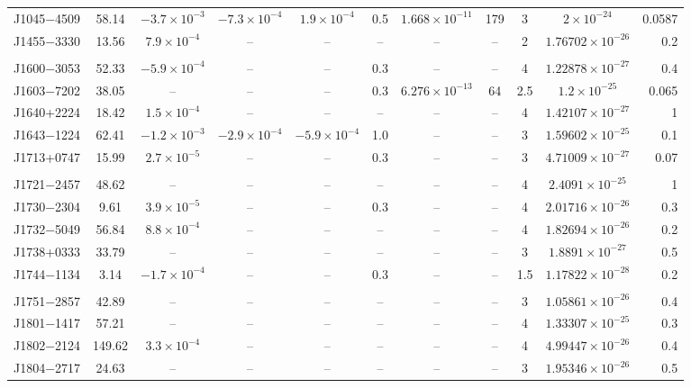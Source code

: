 \begin{table}
\begin{tabular}{lcccccccccr}
J1045$-$4509 & 58.14  & $-3.7\times 10^{-3}$ & $-7.3\times 10^{-4}$ & $1.9\times 10^{-4}$ & 0.5  & $1.668\times 10^{-11}$ & 179 & 3  & $2\times 10^{-24}$ &  0.0587\\
J1455$-$3330 & 13.56  & $7.9\times 10^{-4}$ &  -- &  -- &  -- &  -- & -- & 2  & $1.76702\times 10^{-26}$ &  0.2\\
\\
J1600$-$3053 & 52.33  & $-5.9\times 10^{-4}$ &  -- &  -- & 0.3  &  -- & -- & 4  & $1.22878\times 10^{-27}$ &  0.4\\
J1603$-$7202 & 38.05  &  -- &  -- &  -- & 0.3  & $6.276\times 10^{-13}$ & 64 & 2.5  & $1.2\times 10^{-25}$ &  0.065\\
J1640+2224 & 18.42  & $1.5\times 10^{-4}$ &  -- &  -- &  -- &  -- & -- & 4  & $1.42107\times 10^{-27}$ &  1\\
J1643$-$1224 & 62.41  & $-1.2\times 10^{-3}$ & $-2.9\times 10^{-4}$ & $-5.9\times 10^{-4}$ & 1.0  &  -- & -- & 3  & $1.59602\times 10^{-25}$ &  0.1\\
J1713+0747 & 15.99  & $2.7\times 10^{-5}$ &  -- &  -- & 0.3  &  -- & -- & 3  & $4.71009\times 10^{-27}$ &  0.07\\
\\
J1721$-$2457 & 48.62  &  -- &  -- &  -- &  -- &  -- & -- & 4  & $2.4091\times 10^{-25}$ &  1\\
J1730$-$2304 & 9.61  & $3.9\times 10^{-5}$ &  -- &  -- & 0.3  &  -- & -- & 4  & $2.01716\times 10^{-26}$ &  0.3\\
J1732$-$5049 & 56.84  & $8.8\times 10^{-4}$ &  -- &  -- &  -- &  -- & -- & 4  & $1.82694\times 10^{-26}$ &  0.2\\
J1738+0333 & 33.79  &  -- &  -- &  -- &  -- &  -- & -- & 3  & $1.8891\times 10^{-27}$ &  0.5\\
J1744$-$1134 & 3.14  & $-1.7\times 10^{-4}$ &  -- &  -- & 0.3  &  -- & -- & 1.5  & $1.17822\times 10^{-28}$ &  0.2\\
\\
J1751$-$2857 & 42.89  &  -- &  -- &  -- &  -- &  -- & -- & 3  & $1.05861\times 10^{-26}$ &  0.4\\
J1801$-$1417 & 57.21  &  -- &  -- &  -- &  -- &  -- & -- & 4  & $1.33307\times 10^{-25}$ &  0.3\\
J1802$-$2124 & 149.62  & $3.3\times 10^{-4}$ &  -- &  -- &  -- &  -- & -- & 4  & $4.99447\times 10^{-26}$ &  0.4\\
J1804$-$2717 & 24.63  &  -- &  -- &  -- &  -- &  -- & -- & 3  & $1.95346\times 10^{-26}$ &  0.5\\

\end{tabular}
\end{table}
